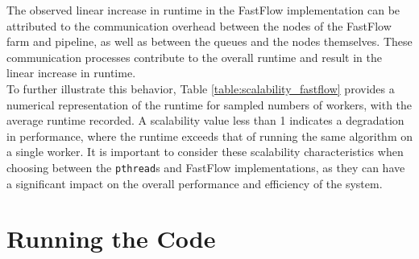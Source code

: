 \documentclass[10pt]{article}
\begin{document}
The observed linear increase in runtime in the FastFlow implementation can be attributed to the communication overhead between the nodes of the FastFlow farm and pipeline, as well as between the queues and the nodes themselves. These communication processes contribute to the overall runtime and result in the linear increase in runtime.\\
To further illustrate this behavior, Table \ref{table:scalability_fastflow} provides a numerical representation of the runtime for sampled numbers of workers, with the average runtime recorded. A scalability value less than 1 indicates a degradation in performance, where the runtime exceeds that of running the same algorithm on a single worker. It is important to consider these scalability characteristics when choosing between the \texttt{pthread}s and FastFlow implementations, as they can have a significant impact on the overall performance and efficiency of the system.
\section{Running the Code} 
\end{document}
